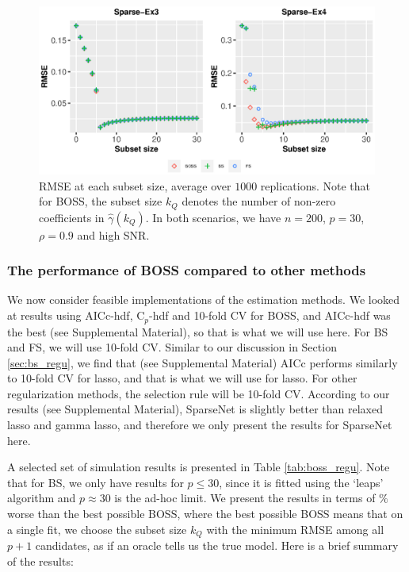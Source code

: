 \begin{figure}[ht!]
	\centering
	\includegraphics[width=\textwidth]{figures/rmse_solpath_lsmethods.eps}
	\caption{RMSE at each subset size, average over $1000$ replications. Note that for BOSS, the subset size $k_Q$ denotes the number of non-zero coefficients in $\hat{\gamma}(k_Q)$. In both scenarios, we have $n=200$, $p=30$, $\rho=0.9$ and high SNR.}
	\label{fig:lossratio_fs_boss_k}
\end{figure}


\subsubsection{The performance of BOSS compared to other methods}
\label{sec:boss_regu}
We now consider feasible implementations of the estimation methods. We looked at results using AICc-hdf, C$_p$-hdf and 10-fold CV for BOSS, and AICc-hdf was the best (see Supplemental Material), so that is what we will use here. For BS and FS, we will use 10-fold CV. Similar to our discussion in Section \ref{sec:bs_regu}, we find that (see Supplemental Material) AICc performs similarly to 10-fold CV for lasso, and that is what we will use for lasso. For other regularization methods, the selection rule will be 10-fold CV. According to our results (see Supplemental Material), SparseNet is slightly better than relaxed lasso and gamma lasso, and therefore we only present the results for SparseNet here. 

A selected set of simulation results is presented in Table \ref{tab:boss_regu}. Note that for BS, we only have results for $p\le 30$, since it is fitted using the `leaps' algorithm and $p \approx 30$ is the ad-hoc limit. We present the results in terms of $\%$ worse than the best possible BOSS, where the best possible BOSS means that on a single fit, we choose the subset size $k_Q$ with the minimum RMSE among all $p+1$ candidates, as if an oracle tells us the true model. Here is a brief summary of the results:


